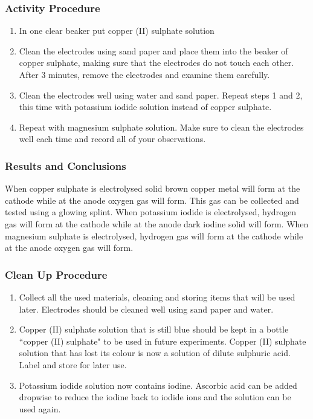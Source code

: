 \subsubsection*{Activity Procedure}
\begin{enumerate}
\item{In one clear beaker put copper (II) sulphate solution}
\item{Clean the electrodes using sand paper and place them into the beaker of copper sulphate, making sure that the electrodes do not touch each other. After 3 minutes, remove the electrodes and examine them carefully.}
\item{Clean the electrodes well using water and sand paper. Repeat steps 1 and 2, this time with potassium iodide solution instead of copper sulphate.}
\item{Repeat with magnesium sulphate solution. Make sure to clean the electrodes well each time and record all of your observations.}
\end{enumerate}

\subsubsection*{Results and Conclusions}
When copper sulphate is electrolysed solid brown copper metal will form at the cathode while at the anode oxygen gas will form. This gas can be collected and tested using a glowing splint.
When potassium iodide is electrolysed, hydrogen gas will form at the cathode while at the anode dark iodine solid will form.
When magnesium sulphate is electrolysed, hydrogen gas will form at the cathode while at the anode oxygen gas will form.

\subsubsection*{Clean Up Procedure}
\begin{enumerate}
\item{Collect all the used materials, cleaning and storing items that will be used later. Electrodes should be cleaned well using sand paper and water.}
\item{Copper (II) sulphate solution that is still blue should be kept in a bottle ``copper (II) sulphate" to be used in future experiments. Copper (II) sulphate solution that has lost its colour is now a solution of dilute sulphuric acid. Label and store for later use.}
\item{Potassium iodide solution now contains iodine. Ascorbic acid can be added dropwise to reduce the iodine back to iodide ions and the solution can be used again.}
\end{enumerate}

